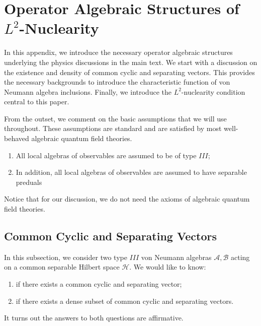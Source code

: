 \documentclass[a4paper,11pt]{article}
\theoremstyle{definition}
\begin{document}

\section{Operator Algebraic Structures of $L^2$-Nuclearity}\label{appendix:operatoralgebraicstructure}
In this appendix, we introduce the necessary operator algebraic structures underlying the physics discussions in the main text. We start with a discussion on the existence and density of common cyclic and separating vectors. This provides the necessary backgrounds to introduce the characteristic function of von Neumann algebra inclusions. Finally, we introduce the $L^2$-nuclearity condition central to this paper.

From the outset, we comment on the basic assumptions that we will use throughout. These assumptions are standard and are satisfied by most well-behaved algebraic quantum field theories.
\begin{enumerate}
    \item All local algebras of observables are assumed to be of type $III$;
    \item In addition, all local algebras of observables are assumed to have separable preduals
\end{enumerate}
Notice that for our discussion, we do not need the axioms of algebraic quantum field theories.
\subsection{Common Cyclic and Separating Vectors}\label{subsection:common}
In this subsection, we consider two type $III$ von Neumann algebras $\mathcal{A},\mathcal{B}$ acting on a common separable Hilbert space $\mathcal{H}$. We would like to know:
\begin{enumerate}
    \item if there exists a common cyclic and separating vector;
    \item if there exists a dense subset of common cyclic and separating vectors.
\end{enumerate}
It turns out the answers to both questions are affirmative.
\end{document}
